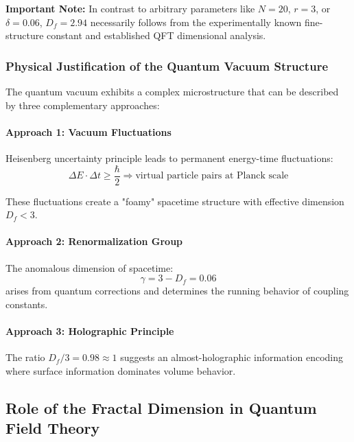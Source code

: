 \documentclass[12pt,a4paper]{article}
\theoremstyle{definition}
\begin{document}
	\begin{tcolorbox}[colback=red!5!white,colframe=red!75!black,title=Methodological Transparency]
		\textbf{Important Note:} In contrast to arbitrary parameters like $N=20$, $r=3$, or $\delta=0.06$, $D_f = 2.94$ necessarily follows from the experimentally known fine-structure constant and established QFT dimensional analysis.
	\end{tcolorbox}
	
	\subsubsection{Physical Justification of the Quantum Vacuum Structure}
	
	The quantum vacuum exhibits a complex microstructure that can be described by three complementary approaches:
	
	\paragraph{Approach 1: Vacuum Fluctuations}
	Heisenberg uncertainty principle leads to permanent energy-time fluctuations:
	\begin{equation}
		\Delta E \cdot \Delta t \geq \frac{\hbar}{2} \Rightarrow \text{virtual particle pairs at Planck scale}
	\end{equation}
	
	These fluctuations create a "foamy" spacetime structure with effective dimension $D_f < 3$.
	
	\paragraph{Approach 2: Renormalization Group}
	The anomalous dimension of spacetime:
	\begin{equation}
		\gamma = 3 - D_f = 0.06
	\end{equation}
	arises from quantum corrections and determines the running behavior of coupling constants.
	
	\paragraph{Approach 3: Holographic Principle}
	The ratio $D_f/3 = 0.98 \approx 1$ suggests an almost-holographic information encoding where surface information dominates volume behavior.
	
	\subsection{Role of the Fractal Dimension in Quantum Field Theory}
	
\end{document}
